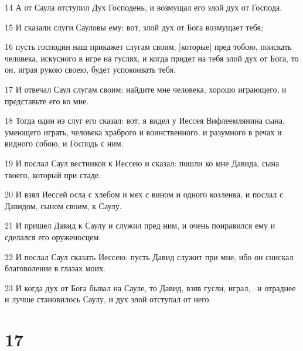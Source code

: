\par 14 А от Саула отступил Дух Господень, и возмущал его злой дух от Господа.
\par 15 И сказали слуги Сауловы ему: вот, злой дух от Бога возмущает тебя;
\par 16 пусть господин наш прикажет слугам своим, [которые] пред тобою, поискать человека, искусного в игре на гуслях, и когда придет на тебя злой дух от Бога, то он, играя рукою своею, будет успокоивать тебя.
\par 17 И отвечал Саул слугам своим: найдите мне человека, хорошо играющего, и представьте его ко мне.
\par 18 Тогда один из слуг его сказал: вот, я видел у Иессея Вифлеемлянина сына, умеющего играть, человека храброго и воинственного, и разумного в речах и видного собою, и Господь с ним.
\par 19 И послал Саул вестников к Иессею и сказал: пошли ко мне Давида, сына твоего, который при стаде.
\par 20 И взял Иессей осла с хлебом и мех с вином и одного козленка, и послал с Давидом, сыном своим, к Саулу.
\par 21 И пришел Давид к Саулу и служил пред ним, и очень понравился ему и сделался его оруженосцем.
\par 22 И послал Саул сказать Иессею: пусть Давид служит при мне, ибо он снискал благоволение в глазах моих.
\par 23 И когда дух от Бога бывал на Сауле, то Давид, взяв гусли, играл, --и отраднее и лучше становилось Саулу, и дух злой отступал от него.

\chapter{17}

